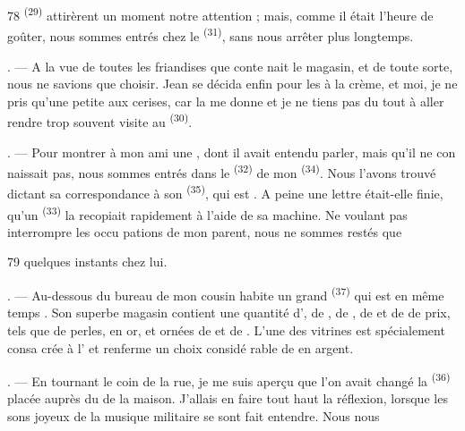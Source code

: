 \begin{VUpage}[80]{78}
\VUcontinue
{} \textsuperscript{(29)} attirèrent un moment notre attention ;\nl
mais, comme il était l'heure de goûter, nous sommes\nl
entrés chez le  \textsuperscript{(31)}, sans nous arrêter plus\nl
longtemps.

. --- A la vue de toutes les friandises que conte\cc
nait le magasin, \nl
et  de toute sorte, nous ne savions que\nl
choisir. Jean se décida enfin pour les  à la\nl
crème, et moi, je ne pris qu'une petite  aux\nl
cerises, car la  me donne \nl
et je ne tiens pas du tout à aller rendre trop souvent\nl
visite au  \textsuperscript{(30)}.

. --- Pour montrer à mon ami une \nl
{}, dont il avait entendu parler, mais qu'il ne con\cc
naissait pas, nous sommes entrés dans le  \textsuperscript{(32)}\nl
de mon  \textsuperscript{(34)}. Nous l'avons trouvé dictant sa\nl
correspondance à son  \textsuperscript{(35)}, qui est \cc
{}. A peine une lettre était-elle finie, qu'un\nl
{} \textsuperscript{(33)} la recopiait rapidement à l'aide\nl
de sa machine. Ne voulant pas interrompre les occu\cc
pations de mon parent, nous ne sommes restés que
\parplein
\end{VUpage}

\begin{VUpage}[81]{79}
\VUcontinue
quelques instants chez lui.

. --- Au-dessous du bureau de mon cousin habite\nl
un grand  \textsuperscript{(37)} qui est en même\nl
temps . Son superbe magasin contient une\nl
quantité d', de , de , de\nl
{} et de  de prix, tels que  de\nl
perles,  en or,  et\nl
{} ornées de  et de \cc
{}. L'une des vitrines est spécialement consa\cc
crée à l' et renferme un choix considé\cc
rable de  en argent.

. --- En tournant le coin de la rue, je me suis\nl
aperçu que l'on avait changé la  \textsuperscript{(36)} placée\nl
auprès du  de la maison. J'allais en faire\nl
tout haut la réflexion, lorsque les sons joyeux de la\nl
musique militaire se sont fait entendre. Nous nous
\parplein
\end{VUpage}


